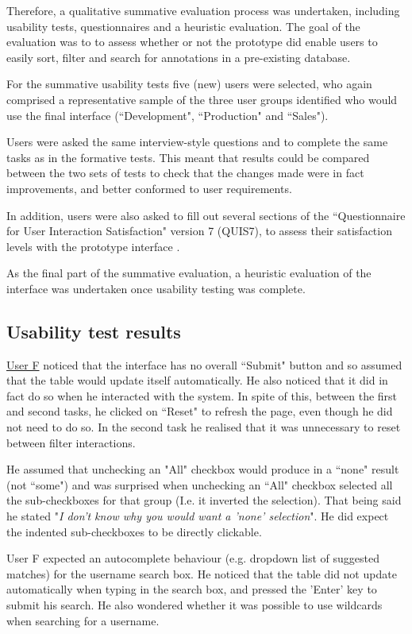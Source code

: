 Therefore, a qualitative summative evaluation process was undertaken, including usability tests, questionnaires and a heuristic evaluation. The goal of the evaluation was to to assess whether or not the prototype did enable users to easily sort, filter and search for annotations in a pre-existing database.

For the summative usability tests five (new) users were selected, who again comprised a representative sample of the three user groups identified who would use the final interface (``Development", ``Production" and ``Sales").

Users were asked the same interview-style questions and to complete the same tasks as in the formative tests. This meant that results could be compared between the two sets of tests to check that the changes made were in fact improvements, and better conformed to user requirements.

In addition, users were also asked to fill out several sections of the ``Questionnaire for User Interaction Satisfaction" version 7 (QUIS7), to assess their satisfaction levels with the prototype interface \citep{QUIS}. 

As the final part of the summative evaluation, a heuristic evaluation of the interface was undertaken once usability testing was complete. 

\subsection{Usability test results}

\underline{User F} noticed that the interface has no overall ``Submit" button and so assumed that the table would update itself automatically. He also noticed that it did in fact do so when he interacted with the system. In spite of this, between the first and second tasks, he clicked on ``Reset" to refresh the page, even though he did not need to do so. In the second task he realised that it was unnecessary to reset between filter interactions. 

He assumed that unchecking an "All" checkbox would produce in a ``none" result (not ``some") and was surprised when unchecking an ``All" checkbox selected all the sub-checkboxes for that group (I.e. it inverted the selection). That being said he stated "\textit{I don't know why you would want a 'none' selection}". He did expect the indented sub-checkboxes to be directly clickable.

User F expected an autocomplete behaviour (e.g. dropdown list of suggested matches) for the username search box. He noticed that the table did not update automatically when typing in the search box, and pressed the 'Enter' key to submit his search. He also wondered whether it was possible to use wildcards when searching for a username.


